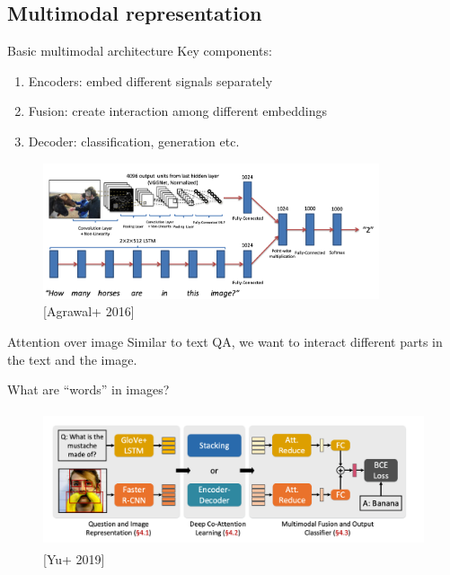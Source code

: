 \documentclass[usenames,dvipsnames,notes]{beamer}
\begin{document}
\subsection{Multimodal representation}
\begin{frame}
    {Basic multimodal architecture}
    Key components:\\
    \begin{enumerate}
        \item Encoders: embed different signals separately
        \item Fusion: create interaction among different embeddings 
        \item Decoder: classification, generation etc.
    \end{enumerate}
    \vspace{-1em}

    \begin{figure}
        \includegraphics[height=4cm]{figures/vqa-model}
        \caption{[Agrawal+ 2016]}
    \end{figure}
\end{frame}

\begin{frame}
    {Attention over image}
    Similar to text QA, we want to interact different parts in the text and the image.

    What are ``words'' in images?

    \begin{figure}
        \includegraphics[height=4cm]{figures/vqa-attention}
        \caption{[Yu+ 2019]}
    \end{figure}
\end{frame}
\end{document}
